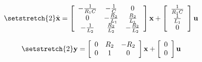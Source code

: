 \[ \setstretch{2}
  \dot{\textbf{x}}=
  \left[
    {\begin{array}{ccc}
      -\frac{1}{R_1 C} & -\frac{1}{C}     & 0 \\
      0                & -\frac{R_2}{L_1} & \frac{R_2}{L_1} \\
      -\frac{1}{L_2}   & \frac{R_2}{L_2}  & -\frac{R_2}{L_2} \\
    \end{array}}
  \right]
  \textbf{x} +
  \left[
    {\begin{array}{cc}
      \frac{1}{R_1 C} \\
      \frac{1}{L_1} \\
      0 \\
    \end{array}}
  \right]
  \textbf{u}
\]

\[ \setstretch{2}
  \textbf{y}=
  \left[
    {\begin{array}{ccc}
      0 & R_2     & -R_2 \\
      0 & 1       & 0 \\
    \end{array}}
  \right]
  \textbf{x} +
  \left[
    {\begin{array}{cc}
      0 \\
      0 \\
    \end{array}}
  \right]
  \textbf{u}
\]
